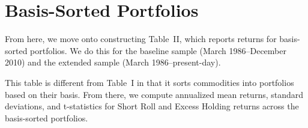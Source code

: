 \documentclass[11pt]{article}
\begin{document}
\section{Basis-Sorted Portfolios}

From here, we move onto constructing Table~II, which reports returns for basis-sorted portfolios. We do this for the baseline sample
(March 1986--December 2010) and the extended sample (March 1986--present-day).

This table is different from Table~I in that it sorts commodities into portfolios based on their basis. 
From there, we compute annualized mean returns, standard deviations, and t-statistics for Short Roll and Excess Holding returns across the basis-sorted portfolios.



\clearpage


\end{document}

